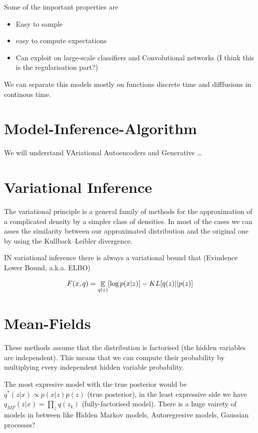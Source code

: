 \documentclass[b5paper]{report}
\begin{document}
Some of the important properties are

\begin{itemize}
  \item Easy to sample
  \item easy to compute expectations
  \item Can exploit on large-scale classifiers and Convolutional networks
        (I think this is the regularisation part?)
\end{itemize}

We can separate this models mostly on functions discrete time and difffusions
in continous time.

\section{Model-Inference-Algorithm}

We will understand VAriational Autoencoders and Generative \dots

\section{Variational Inference}

The variational principle is a general family of methods for the approximation
of a complicated density by a simpler class of densities. In most of the cases
we can asses the similarity between our approximated distribution and the
original one by using the Kullback–Leibler divergence.

IN variational inference there is always a variational bound that (Evindence
Lower Bound, a.k.a. ELBO)

\begin{equation}
  F(x,q) = \operatorname*{\mathbb{\mathop{E}}}_{q(z)}[\log p(x|z)] - KL[q(z)||p(z)]
\end{equation}

\section{Mean-Fields}

These methods assume that the distribution is factorised (the hidden variables
are independent). This means that we can compute their probability by
multiplying every independent hidden variable probability.


The most expresive model with the true posterior would be $q^*(z|x)
\propto p(x|z)p(z)$ (true posterior), in the least expressive side we have $q_{MF}(z|x) =
\prod_z q(z_k)$ (fully-factorised model). There is a huge vairety of models in
between like Hidden Markov models, Autoregresive models, Gaussian processes?
\end{document}
